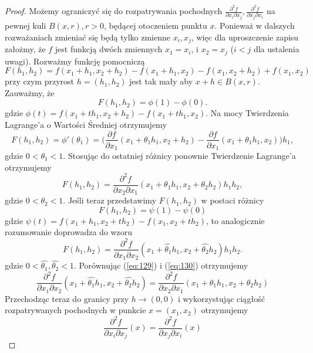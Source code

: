 \documentclass[leqno]{article}
\begin{document}
\begin{justify}
\begin{proof}
    Możemy ograniczyć się do rozpatrywania pochodnych $\frac{\partial ^2 f}{\partial x_i \partial x_j}, \frac{\partial ^2 f}{\partial x_j \partial x_i}$
    na pewnej kuli $B(x, r), r > 0$, będącej otoczeniem punktu $x$. Ponieważ w dalszych rozważaniach zmieniać się będą tylko zmienne $x_i, x_j$, więc dla uproszczenie zapisu 
    założmy, że $f$ jest funkcją dwóch zmiennych $x_1 = x_i$, i $x_2 = x_j$ ($i < j$ dla ustalenia uwagi). Rozważmy funkcję pomocniczą 
    \[
        F(h_1, h_2) = f(x_1 + h_1, x_2 + h_2) - f(x_1 + h_1, x_2) - f(x_1, x_2 + h_2) + f(x_1, x_2)
    \]
    przy czym przyrost $h = (h_1, h_2)$ jest tak mały aby $x + h \in B(x,r)$. Zauważmy, że 
    \[
        F(h_1, h_2) = \phi(1) - \phi(0).
    \]
    gdzie $\phi(t) = f(x_1 + th_1, x_2 + h_2) - f(x_1 + th_1, x_2)$. Na mocy Twierdzenia Lagrange'a o Wartości Średniej otrzymujemy
    \[
        F(h_1, h_2) = \phi'(\theta_1) = \Big( \frac{\partial f}{\partial x_1}(x_1 + \theta_1h_1, x_2 + h_2) - \frac{\partial f}{\partial x_1}(x_1 + \theta_1 h_1, x_2)\Big)h_1,
    \]
    gdzie $0 < \theta_1 < 1$. Stosując do ostatniej różnicy ponownie Twierdzenie Lagrange'a otrzymujemy 
    \begin{equation}\label{eq:129}
        F(h_1, h_2) = \frac{\partial ^2 f}{\partial x_2 \partial x_1}(x_1 + \theta_1 h_1, x_2 + \theta_2 h_2)h_1 h_2,
    \end{equation}
    gdzie $0 < \theta_2 < 1$. Jeśli teraz przedstawimy $F(h_1, h_2)$ w postaci różnicy 
    \[
        F(h_1, h_2) = \psi(1) - \psi(0)
    \]
    gdzie $\psi(t) = f(x_1 + h_1, x_2 + th_2) - f(x_1, x_2 + th_2)$, to analogicznie rozumowanie doprowadza do wzoru 
    \begin{equation}\label{eq:130}
        F(h_1, h_2) = \frac{\partial ^2 f}{\partial x_1 \partial x_2}(x_1 + \hat{\theta_1}h_1, x_2 + \hat{\theta_2}h_2)h_1h_2.
    \end{equation}
    gdzie $0 < \hat{\theta_1}, \hat{\theta_2} < 1$. Porównując (\ref{eq:129}) i (\ref{eq:130}) otrzymujemy 
    \[
        \frac{\partial ^2 f}{\partial x_1 \partial x_2}(x_1 + \hat{\theta_1}h_1, x_2 + \hat{\theta_2}h_2) = \frac{\partial ^2 f}{\partial x_2 \partial x_1}(x_1 + \theta_1 h_1, x_2 + \theta_2 h_2)
    \]
    Przechodząc teraz do granicy przy $h \to (0, 0)$ i wykorzystując ciągłość rozpatrywanych pochodnych w punkcie $x = (x_1, x_2)$ otrzymujemy 
    \[
        \frac{\partial ^2 f}{\partial x_i \partial x_j}(x) = \frac{\partial ^2 f}{\partial x_j \partial x_i}(x)
    \]
\end{proof}


\end{justify}
\end{document}
